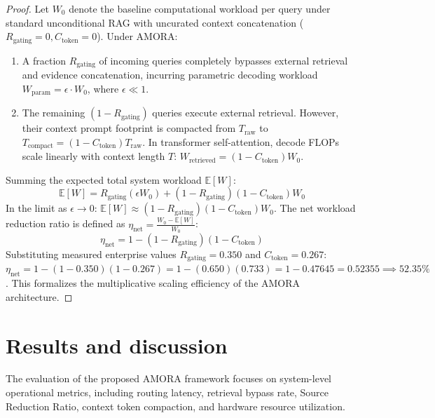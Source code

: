 \documentclass[fleqn,10pt]{article}
\begin{document}
\begin{proof}
Let $W_0$ denote the baseline computational workload per query under standard unconditional RAG with uncurated context concatenation ($R_{\text{gating}} = 0, C_{\text{token}} = 0$). Under AMORA:
\begin{enumerate}[leftmargin=1.5em,noitemsep]
    \item A fraction $R_{\text{gating}}$ of incoming queries completely bypasses external retrieval and evidence concatenation, incurring parametric decoding workload $W_{\text{param}} = \epsilon \cdot W_0$, where $\epsilon \ll 1$.
    \item The remaining $(1 - R_{\text{gating}})$ queries execute external retrieval. However, their context prompt footprint is compacted from $T_{\text{raw}}$ to $T_{\text{compact}} = (1 - C_{\text{token}}) T_{\text{raw}}$. In transformer self-attention, decode FLOPs scale linearly with context length $T$: $W_{\text{retrieved}} = (1 - C_{\text{token}}) W_0$.
\end{enumerate}
Summing the expected total system workload $\mathbb{E}[W]$:
\begin{equation}
\mathbb{E}[W] = R_{\text{gating}}(\epsilon W_0) + (1 - R_{\text{gating}})(1 - C_{\text{token}}) W_0
\end{equation}
In the limit as $\epsilon \to 0$:
$\mathbb{E}[W] \approx (1 - R_{\text{gating}})(1 - C_{\text{token}}) W_0$.
The net workload reduction ratio is defined as $\eta_{\text{net}} = \frac{W_0 - \mathbb{E}[W]}{W_0}$:
\begin{equation}
\eta_{\text{net}} = 1 - (1 - R_{\text{gating}})(1 - C_{\text{token}})
\end{equation}
Substituting measured enterprise values $R_{\text{gating}} = 0.350$ and $C_{\text{token}} = 0.267$:
$\eta_{\text{net}} = 1 - (1 - 0.350)(1 - 0.267) = 1 - (0.650)(0.733) = 1 - 0.47645 = 0.52355 \implies 52.35\%$.
This formalizes the multiplicative scaling efficiency of the AMORA architecture.
\end{proof}

\section{Results and discussion}
The evaluation of the proposed AMORA framework focuses on system-level operational metrics, including routing latency, retrieval bypass rate, Source Reduction Ratio, context token compaction, and hardware resource utilization.
\end{document}

